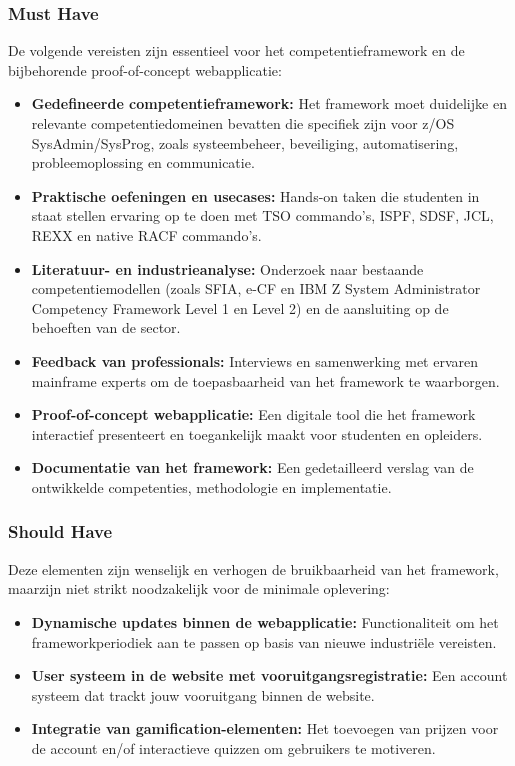 \subsubsection{Must Have}
De volgende vereisten zijn essentieel voor het competentieframework en de bijbehorende proof-of-concept webapplicatie:
\begin{itemize}
    \item \textbf{Gedefineerde competentieframework:} Het framework moet duidelijke en relevante competentiedomeinen bevatten die specifiek zijn voor z/OS SysAdmin/SysProg, zoals systeembeheer, beveiliging, automatisering, probleemoplossing en communicatie.
    \item \textbf{Praktische oefeningen en usecases:} Hands-on taken die studenten in staat
stellen ervaring op te doen met TSO commando's, ISPF, SDSF, JCL, REXX en native RACF commando's.
    \item \textbf{Literatuur- en industrieanalyse:} Onderzoek naar bestaande competentiemodellen (zoals SFIA, e-CF en IBM Z System Administrator Competency Framework Level 1 en Level 2) en de aansluiting op de behoeften van de sector.
    \item \textbf{Feedback van professionals:} Interviews en samenwerking met ervaren mainframe experts om de toepasbaarheid van het framework te waarborgen.
    \item \textbf{Proof-of-concept webapplicatie:} Een digitale tool die het framework interactief presenteert en toegankelijk maakt voor studenten en opleiders.
    \item \textbf{Documentatie van het framework:} Een gedetailleerd verslag van de ontwikkelde competenties, methodologie en implementatie.
\end{itemize}
\subsubsection{Should Have}
Deze elementen zijn wenselijk en verhogen de bruikbaarheid van het framework,
maarzijn niet strikt noodzakelijk voor de minimale oplevering:
\begin{itemize}
    \item \textbf{Dynamische updates binnen de webapplicatie:} Functionaliteit om het frameworkperiodiek aan te passen op basis van nieuwe industriële vereisten.
    \item \textbf{User systeem in de website met vooruitgangsregistratie:} Een account systeem dat trackt jouw vooruitgang binnen de website.
    \item \textbf{Integratie van gamification-elementen:} Het toevoegen van prijzen voor de account en/of interactieve quizzen om gebruikers te motiveren.
\end{itemize}
